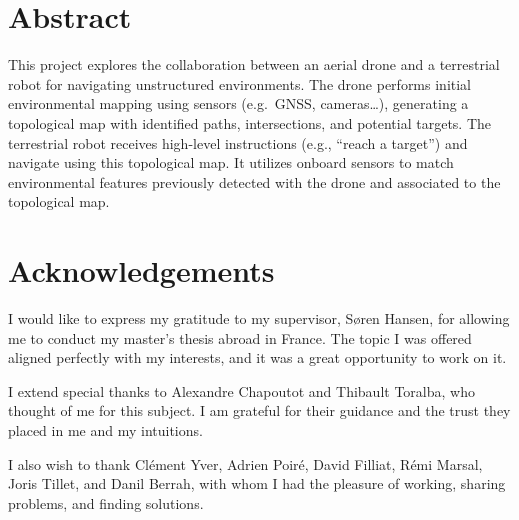 \section*{Abstract}\label{sec:abstract}

This project explores the collaboration between an aerial drone and a terrestrial robot for navigating unstructured environments.
The drone performs initial environmental mapping using sensors (e.g.\ GNSS, cameras\ldots), generating a topological map with identified paths, intersections, and potential targets.
The terrestrial robot receives high-level instructions (e.g., “reach a target”) and navigate using this topological map.
It utilizes onboard sensors to match environmental features previously detected with the drone and associated to the topological map.

\vspace{5cm}

\section*{Acknowledgements}\label{sec:acknowledgements}

I would like to express my gratitude to my supervisor, Søren Hansen, for allowing me to conduct my master’s thesis abroad in France.
The topic I was offered aligned perfectly with my interests, and it was a great opportunity to work on it.

I extend special thanks to Alexandre Chapoutot and Thibault Toralba, who thought of me for this subject.
I am grateful for their guidance and the trust they placed in me and my intuitions.

I also wish to thank Clément Yver, Adrien Poiré, David Filliat, Rémi Marsal, Joris Tillet, and Danil Berrah,
with whom I had the pleasure of working, sharing problems, and finding solutions.

